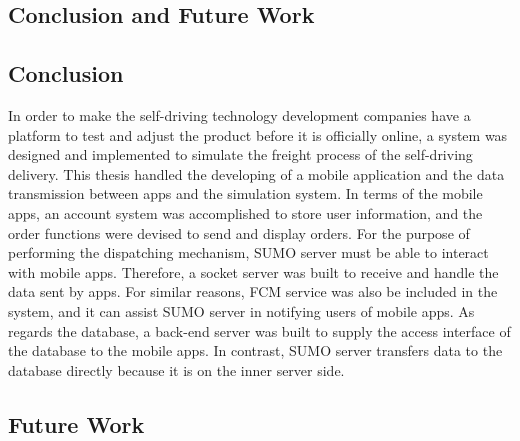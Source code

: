 \documentclass[12pt]{ksthesis}
\begin{document}
\begin{thesis}
{%







\chapter{Conclusion and Future Work} \label{Chap:Conclusion}

\section{Conclusion}
In order to make the self-driving technology development companies have a platform to test and adjust the product before it is officially online, a system was designed and implemented to simulate the freight process of the self-driving delivery. This thesis handled the developing of a mobile application and the data transmission between apps and the simulation system. In terms of the mobile apps, an account system was accomplished to store user information, and the order functions were devised to send and display orders. For the purpose of performing the dispatching mechanism, SUMO server must be able to interact with mobile apps. Therefore, a socket server was built to receive and handle the data sent by apps. For similar reasons, FCM service was also be included in the system, and it can assist SUMO server in notifying users of mobile apps. As regards the database, a back-end server was built to supply the access interface of the database to the mobile apps. In contrast, SUMO server transfers data to the database directly because it is on the inner server side.


\section{Future Work}


} \end{thesis}

\singlespace {\large



}



\doublespace

\begin{vita}
\Thesisspace \large{


}\end{vita}
\end{document}

